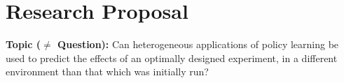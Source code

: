 \documentclass[12pt,letterpaper,doublespace, oneside]{article}
\begin{document}
\newcommand{\zz}{\mathbx Z}   %
\newcommand{\qq}{\mathbx Q}   %
\newcommand{\ff}{\mathbx F}   %
\newcommand{\rr}{\mathbx R}   %
\newcommand{\nn}{\mathbx N}   %
\newcommand{\cc}{\mathbx C}   %
\newcommand{\dd}{\mathsf D}   
\newcommand{\id}{\operatorname{id}} %
\newcommand{\im}{\operatorname{im}} %
\newcommand{\dom}{\operatorname{dom}} %
\newcommand{\abs}[1]{\left\lvert#1\right\rvert} %
\newcommand{\norm}[1]{\left\lVert#1\right\rVert} %
\newcommand{\modar}[1]{\operatorname{mod}{#1}} %
\newcommand{\set}[1]{\left\{#1\right\}} %
\newcommand{\setp}[2]{\left\{#1\ :\ #2\right\}} %
\newcommand{\lag}{\mathcal{L}}

\renewcommand\thepage{}

\renewcommand{\epsilon}{\varepsilon}
\renewcommand{\phi}{\varphi}
\renewcommand{\emptyset}{\varnothing}
\renewcommand{\geq}{\geqslant}
\renewcommand{\leq}{\leqslant}
\renewcommand{\Re}{\operatorname{Re}}
\renewcommand{\Im}{\operatorname{Im}}


\theoremstyle{theorem}
\newtheorem{theorem}{Theorem}
\theoremstyle{proposition}
\newtheorem{proposition}{Proposition}
\theoremstyle{definition}
\newtheorem{definition}{Definition}
\theoremstyle{lemma}
\newtheorem{lemma}[theorem]{Lemma}
\theoremstyle{corollary}
\newtheorem{corollary}[theorem]{Corollary}
\theoremstyle{example}
\newtheorem{example}[theorem]{Example}
\theoremstyle{remark}
\newtheorem{remark}[theorem]{Remark}
\theoremstyle{conclusion}
\newtheorem{conclusion}[theorem]{Conclusion}






\section{Research Proposal}

\noindent\textbf{Topic ($\neq$ Question):} Can heterogeneous applications of policy learning be used to predict the effects of an optimally designed experiment, in a different environment than that which was initially run?
\end{document}

